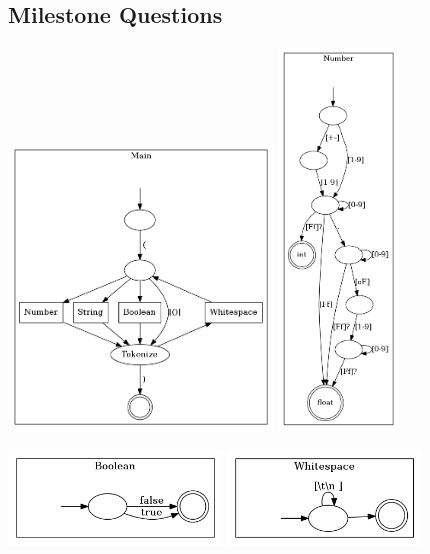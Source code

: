 \documentclass[12pt]{article}
\begin{document}
\subsection{Milestone Questions}
\includegraphics[height=3in]{main.png}
\includegraphics[height=4in]{number.png}

\includegraphics[height=1in]{boolean.png}
\includegraphics[height=1in]{whitespace.png}
\end{document}
